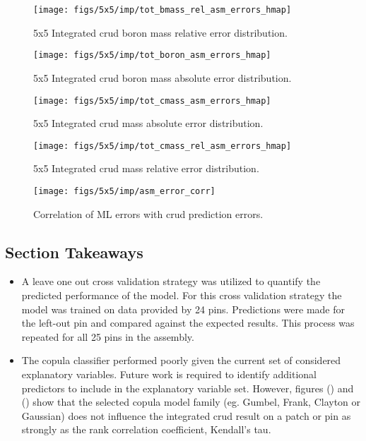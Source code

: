 \begin{figure}[H]
    \centering
    \texttt{[image: figs/5x5/imp/tot\_bmass\_rel\_asm\_errors\_hmap]}
    \caption{5x5 Integrated crud boron mass relative error distribution.}
    \label{fig:totbmassrelasmerrorshmap}
\end{figure}
\begin{figure}[H]
    \centering
    \texttt{[image: figs/5x5/imp/tot\_boron\_asm\_errors\_hmap]}
    \caption{5x5 Integrated crud boron mass absolute error distribution.}
    \label{fig:totboronasmerrorshmap}
\end{figure}
\begin{figure}[H]
    \centering
    \texttt{[image: figs/5x5/imp/tot\_cmass\_asm\_errors\_hmap]}
    \caption{5x5 Integrated crud mass absolute error distribution.}
    \label{fig:totcmassasmerrorshmap}
\end{figure}
\begin{figure}[H]
    \centering
    \texttt{[image: figs/5x5/imp/tot\_cmass\_rel\_asm\_errors\_hmap]}
    \caption{5x5 Integrated crud mass relative error distribution.}
    \label{fig:totcmassrelasmerrorshmap}
\end{figure}

\begin{figure}[H]
    \centering
    \texttt{[image: figs/5x5/imp/asm\_error\_corr]}
    \caption{Correlation of ML errors with crud prediction errors.}
    \label{fig:asmerrorcorr}
\end{figure}

\subsection{Section Takeaways}


\begin{itemize}
    \item A leave one out cross validation strategy was utilized to quantify the predicted performance of the model.  For this cross validation strategy the model was trained on data provided by 24 pins.  Predictions were made for the left-out pin and compared against the expected results.  This process was repeated for all 25 pins in the assembly.

	\item The copula classifier performed poorly given the current set of considered explanatory variables.  Future work is required to identify additional predictors to include in the explanatory variable set.  However, figures () and () show that the selected copula model family (eg. Gumbel, Frank, Clayton or Gaussian) does not influence the integrated crud result on a patch or pin as strongly as the rank correlation coefficient, Kendall's tau.
\end{itemize}

